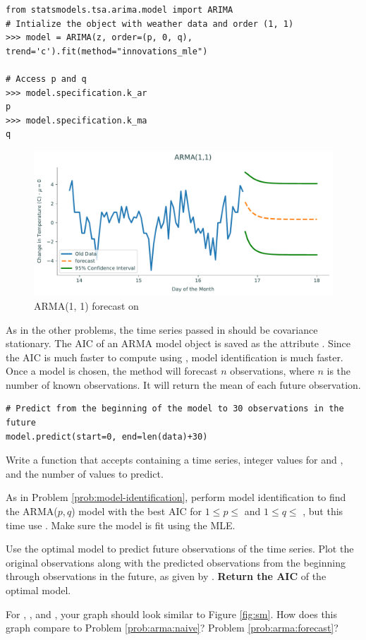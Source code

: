 \begin{lstlisting}
from statsmodels.tsa.arima.model import ARIMA
# Intialize the object with weather data and order (1, 1)
>>> model = ARIMA(z, order=(p, 0, q), trend='c').fit(method="innovations_mle")

# Access p and q
>>> model.specification.k_ar
p
>>> model.specification.k_ma
q
\end{lstlisting}

\begin{figure}
\centering
\includegraphics[width=\textwidth]{figures/arma.pdf}
\caption{ARMA(1, 1) forecast on }
\label{fig:forecasted}
\end{figure}

As in the other problems, the time series passed in should be covariance stationary.
The AIC of an ARMA model object is saved as the attribute .
Since the AIC is much faster to compute using , model identification is much faster.
Once a model is chosen, the method  will forecast $n$ observations, where $n$ is the number of known observations.
It will return the mean of each future observation.

\begin{lstlisting}
# Predict from the beginning of the model to 30 observations in the future
model.predict(start=0, end=len(data)+30)
\end{lstlisting}

\begin{problem}
Write a function  that accepts  containing a time series, integer values for  and , and the number  of values to predict.

As in Problem \ref{prob:model-identification}, perform model identification to find the ARMA($p,q$) model with the best AIC for $1\leq p \leq$  and $1 \leq q \leq$ , but this time use .
Make sure the model is fit using the MLE.

Use the optimal model to predict  future observations of the time series.
Plot the original observations along with the predicted observations from the beginning through  observations in the future, as given by .
\textbf{Return the AIC} of the optimal model.

For , , and , your graph should look similar to Figure \ref{fig:sm}.
How does this graph compare to Problem \ref{prob:arma:naive}? Problem \ref{prob:arma:forecast}?
\label{prob:statsmodels}
\end{problem}

